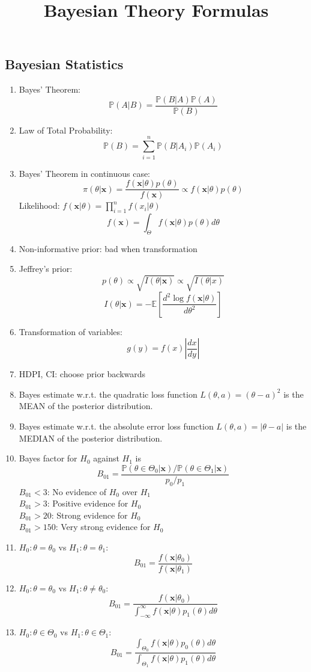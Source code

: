 \documentclass[11pt,a4paper]{article}
\title{Bayesian Theory Formulas}
\begin{document}
\begin{multicols}{2}

\section*{Bayesian Statistics}

\begin{enumerate}
\item Bayes' Theorem: 
$$\mathbb{P}(A|B) = \frac{\mathbb{P}(B|A) \mathbb{P}(A)}{\mathbb{P}(B)}$$
\item Law of Total Probability: 
$$\mathbb{P}(B) = \sum_{i=1}^{n} \mathbb{P}(B|A_i) \mathbb{P}(A_i)$$
\item Bayes' Theorem in continuous case: 
$$\displaystyle \pi(\theta|\boldsymbol x) = \frac{f(\boldsymbol x|\theta) p(\theta)}{f(\boldsymbol x)} \propto f(\boldsymbol x|\theta) p(\theta)$$ 
Likelihood: $\displaystyle f(\boldsymbol x|\theta) = \prod_{i=1}^n f(x_i | \theta)$ 
$$f(\boldsymbol x) = \int_\Theta f(\boldsymbol x|\theta) p(\theta) d\theta$$

\item Non-informative prior: bad when transformation
\item Jeffrey's prior: 
$$p(\theta) \propto \sqrt{I(\theta|\boldsymbol x)} \propto \sqrt{I(\theta|x)}$$
$$I(\theta|\boldsymbol x) = - \mathbb{E} \left[ \frac{d^2 \log f(\boldsymbol x|\theta)}{d\theta^2} \right]$$
\item Transformation of variables: 
$$\displaystyle g(y) = f(x) \left| \frac{dx}{dy} \right|$$

\item HDPI, CI: choose prior backwards
\item Bayes estimate w.r.t. the quadratic loss function $L(\theta,a) = (\theta-a)^2$ is the MEAN of the posterior distribution. 
\item Bayes estimate w.r.t. the absolute error loss function $L(\theta,a) = |\theta-a|$ is the MEDIAN of the posterior distribution. 

\item Bayes factor for $H_0$ against $H_1$ is 
$$B_{01} = \frac{\mathbb{P}(\theta \in \Theta_0 | \boldsymbol x) / \mathbb{P}(\theta \in \Theta_1 | \boldsymbol x)}{p_0 / p_1}$$ 
$B_{01}<3$: No evidence of $H_0$ over $H_1$\\
$B_{01}>3$: Positive evidence for $H_0$\\
$B_{01}>20$: Strong evidence for $H_0$\\
$B_{01}>150$: Very strong evidence for $H_0$
\item $H_0: \theta=\theta_0$ vs $H_1: \theta=\theta_1$: 
$$B_{01} = \frac{f(\boldsymbol x|\theta_0)}{f(\boldsymbol x|\theta_1)}$$
\item $H_0: \theta=\theta_0$ vs $H_1: \theta \neq \theta_0$: 
$$B_{01} = \frac{f(\boldsymbol x|\theta_0)}{\int_{-\infty}^\infty f(\boldsymbol x|\theta) p_1(\theta) d\theta}$$
\item $H_0: \theta \in \Theta_0$ vs $H_1: \theta \in \Theta_1$: 
$$B_{01} = \frac{\int_{\Theta_0} f(\boldsymbol x|\theta) p_0(\theta) d\theta}{\int_{\Theta_1} f(\boldsymbol x|\theta) p_1(\theta) d\theta}$$


\end{enumerate}
\end{multicols}
\end{document}
